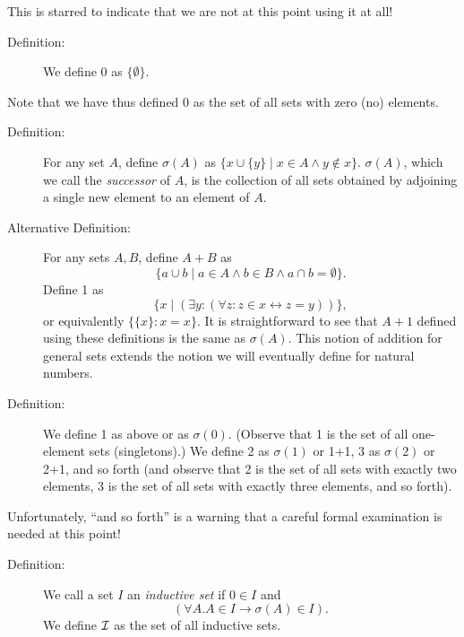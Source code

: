 \documentclass[12pt]{book}
\begin{document}
This is starred to indicate that we are not at this point using it at all!


\begin{description}
\item[Definition:]  We define 0 as $\{\emptyset\}$.  

\end{description}

Note that we have thus defined 0 as the set
of all sets with zero (no) elements.

\begin{description}

\item [Definition:] For any set $A$, define $\sigma(A)$ as $\{x \cup \{y\} \mid x \in A \wedge y
\not\in x\}$.  $\sigma(A)$, which we call the {\em successor\/} of $A$, is the collection of all sets obtained by
adjoining a single new element to an element of $A$. 

\item[Alternative Definition:]  For any sets $A,B$, define $A+B$ as $$\{a \cup b\mid a \in A \wedge b \in B \wedge a \cap b = \emptyset\}.$$  Define 1 as $$\{x\mid (\exists y:(\forall z:z \in x \leftrightarrow z=y))\},$$ or equivalently $\{\{x\}:x=x\}$.  It is straightforward to see that $A+1$ defined using these definitions is the same as $\sigma(A)$.  This notion of addition for general sets extends the notion we will eventually define for natural numbers.

\item[Definition:] We define 1 as above or as $\sigma(0)$.  (Observe that 1 is the set
of all one-element sets (singletons).)  We define 2 as $\sigma(1)$ or 1+1, 3 as $\sigma(2)$ or 2+1,
and so forth (and observe that 2 is the set of all sets with exactly
two elements, 3 is the set of all sets with exactly three elements,
and so forth).

\end{description}

Unfortunately, ``and so forth'' is a warning that a careful formal
examination is needed at this point!

\begin{description}

\item[Definition:] We call a set $I$ an {\em inductive set\/} if $0
\in I$ and $$(\forall A.A \in I \rightarrow \sigma(A) \in I).$$  We define
$\cal I$ as the set of all inductive sets.

\end{description}
\end{document}
